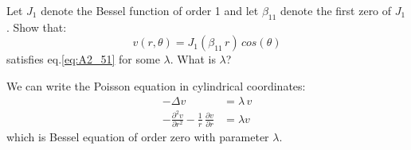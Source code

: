 \documentclass[../main.tex]{subfiles}
\begin{document}
Let $J_1$ denote the Bessel function of order 1 and let $\beta_{11}$ denote the first zero of $J_1$. Show that:
\begin{equation}
     v(r, \theta) = J_1(\beta_{11} \, r) \, cos(\theta)
\end{equation}
satisfies eq.\ref{eq:A2_51} for some $\lambda$. What is $\lambda$?

We can write the Poisson equation in cylindrical coordinates:
\begin{align}
    - \Delta v &= \lambda \, v \\
    - \frac{\partial^2 v}{\partial r^2} - \frac{1}{r} \, \frac{\partial v}{\partial r} &= \lambda v
\end{align}
which is Bessel equation of order zero with parameter $\lambda$.
\end{document}
